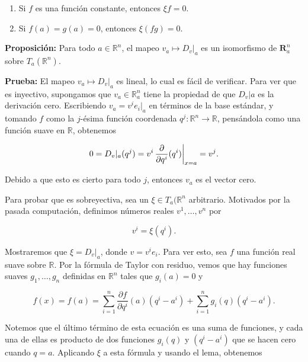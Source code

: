 \documentclass[a4paper,10pt]{article}
\numberwithin{equation}{section}
\newcommand{\zerodel}{.\kern-\nulldelimiterspace}
\newcommand{\prueba}{\textbf{Prueba: }}
\newcommand{\proposicion}{\textbf{Proposición: }}
\begin{document}
\begin{enumerate}[label=(\alph*)]
 \item Si $f$ es una función constante, entonces $\xi f = 0$.
 \item Si $f(a) = g(a) = 0$, entonces $\xi(fg) = 0$. 
\end{enumerate}

\proposicion Para todo $a \in \mathbb{R}^n$, el mapeo $v_a \mapsto D_v|_a$ es 
un isomorfismo de $\mathbf{R}^n_a$ sobre $T_a(\mathbb{R}^n)$.

\prueba El mapeo  $v_a \mapsto D_v|_a$ es lineal, lo cual es fácil de verificar. 
Para ver que es inyectivo, supongamos que $v_a \in \mathbb{R}^n_a$ tiene 
la propiedad de que $D_v|a$ es la derivación cero. Escribiendo $v_a = v^ie_i|_a$
en términos de la base estándar, y tomando $f$ como la $j$-ésima función 
coordenada $q^j: \mathbb{R}^n \rightarrow \mathbb{R}$, pensándola como 
una función suave en $\mathbb{R}$, obtenemos 

\begin{equation}
 0 = D_v|_a (q^j) = v^i \left\zerodel\frac{\partial}{\partial q^i}(q^i)\right|_{x=a} = v^j.
\end{equation}

Debido a que esto es cierto para todo $j$, entonces $v_a$ es el vector 
cero. 

\vspace{.3cm}

Para probar que es sobreyectiva, sea un $\xi \in T_a(\mathbb{R}^n$ arbitrario. 
Motivados por la pasada computación, definimos números reales $v^1,\dots,v^n$ 
por 

\begin{equation}
 v^i = \xi(q^i).
\end{equation}

Mostraremos que $\xi = D_v|_a$, donde $v = v^ie_i$. Para ver esto, 
sea $f$ una función real suave sobre $\mathbb{R}$. Por la fórmula 
de Taylor con residuo, vemos que hay funciones suaves $g_1,\dots,g_n$ 
definidas en $\mathbb{R}^n$ tales que $g_i(a) = 0$ y 

\begin{equation}
 f(x) = f(a) = \sum_{i=1}^n \frac{\partial f}{\partial q^i}(a) (q^i - a^i) 
 + \sum_{i=1}^n g_i(q) (q^i - a^i).
\end{equation}

Notemos que el último término de esta ecuación es una suma de funciones, 
y cada una de ellas es producto de dos funciones $g_i(q)$ y $(q^i - a^i)$ que 
se hacen cero cuando $q=a$. Aplicando $\xi$ a esta fórmula y usando 
el lema, obtenemos 
\end{document}

